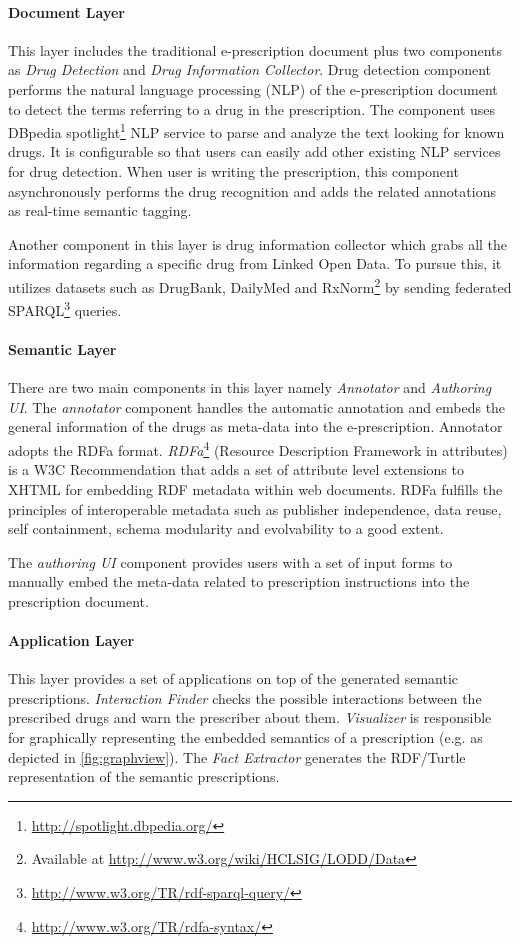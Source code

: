 \documentclass[10pt, conference, compsocconf]{IEEEtran}
\begin{document}
\paragraph{Document Layer} This layer includes the traditional e-prescription document plus two components as \emph{Drug Detection} and \emph{Drug Information Collector}.
Drug detection component performs the natural language processing (NLP) of the e-prescription document to detect the terms referring to a drug in the prescription.
The component uses DBpedia spotlight\footnote{\url{http://spotlight.dbpedia.org/}} NLP service to parse and analyze the text looking for known drugs.
It is configurable so that users can easily add other existing NLP services for drug detection.
When user is writing the prescription, this component asynchronously performs the drug recognition and adds the related annotations as real-time semantic tagging.

Another component in this layer is drug information collector which grabs all the information regarding a specific drug from Linked Open Data.
To pursue this, it utilizes datasets such as DrugBank, DailyMed and RxNorm\footnote{Available at \url{http://www.w3.org/wiki/HCLSIG/LODD/Data}} by sending federated SPARQL\footnote{\url{http://www.w3.org/TR/rdf-sparql-query/}} queries.

\paragraph{Semantic Layer}
There are two main components in this layer namely \emph{Annotator} and \emph{Authoring UI}.
The \emph{annotator} component handles the automatic annotation and embeds the general information of the drugs as meta-data into the e-prescription.
Annotator adopts the RDFa format. \emph{RDFa}\footnote{\url{http://www.w3.org/TR/rdfa-syntax/}} (Resource Description Framework in attributes) is a W3C Recommendation that adds a set of attribute level extensions to XHTML for embedding RDF metadata within web documents.
RDFa fulfills the principles of interoperable metadata such as publisher independence, data reuse, self containment, schema modularity and evolvability to a good extent.

The \emph{authoring UI} component provides users with a set of input forms to manually embed the meta-data related to prescription instructions into the prescription document.

\paragraph{Application Layer}
This layer provides a set of applications on top of the generated semantic prescriptions.
\emph{Interaction Finder} checks the possible interactions between the prescribed drugs and warn the prescriber about them.
\emph{Visualizer} is responsible for graphically representing the embedded semantics of a prescription (e.g. as depicted in \autoref{fig:graphview}).
The \emph{Fact Extractor} generates the RDF/Turtle representation of the semantic prescriptions.
\end{document}
